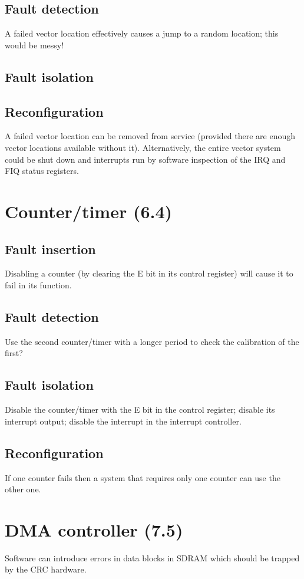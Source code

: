 \documentclass[oneside, a4paper, 11pt]{memoir}
\begin{document}
\subsection*{Fault detection}
A failed vector location effectively causes a jump to a random location; this would be messy!
\subsection*{Fault isolation}
\subsection*{Reconfiguration}
A failed vector location can be removed from service (provided there are enough vector locations
available without it). Alternatively, the entire vector system could be shut down and interrupts run
by software inspection of the IRQ and FIQ status registers.

\section{Counter/timer (6.4)}
\subsection*{Fault insertion}
Disabling a counter (by clearing the E bit in its control register) will cause it to fail in its function.
\subsection*{Fault detection}
Use the second counter/timer with a longer period to check the calibration of the first?
\subsection*{Fault isolation}
Disable the counter/timer with the E bit in the control register; disable its interrupt output; disable
the interrupt in the interrupt controller.
\subsection*{Reconfiguration}
If one counter fails then a system that requires only one counter can use the other one.

\section{DMA controller (7.5)}
Software can introduce errors in data blocks in SDRAM which should be trapped by the CRC
hardware.
\end{document}
